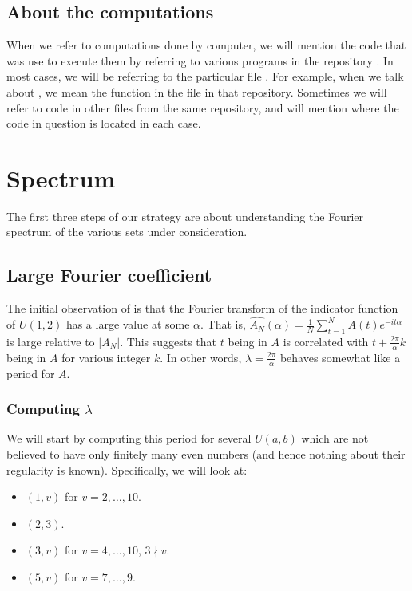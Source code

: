 \documentclass{report}
\theoremstyle{remark}
\numberwithin{equation}{section}
\begin{document}
\section{About the computations}

When we refer to computations done by computer, we will mention the
code that was use to execute them by referring to various programs in
the repository \cite{ross:gh2016}.  In most cases, we will be
referring to the particular file .  For
example, when we talk about , we mean the function
 in the  file in that
repository.  Sometimes we will refer to code in other files from the
same repository, and will mention where the code in question is
located in each case.

\chapter{Spectrum}

The first three steps of our strategy are about understanding the
Fourier spectrum of the various \relevant sets under consideration.

\section{Large Fourier coefficient}

The initial observation of \cite{steinerberger:preprint} is that the
Fourier transform of the indicator function of $U(1,2)$ has a large
value at some $\alpha$.  That is,
$\widehat{A_N}(\alpha) = \frac1N \sum_{t=1}^N A(t) e^{-it\alpha}$ is
large relative to $|A_N|$.  This suggests that $t$ being in $A$ is
correlated with $t+\frac{2\pi}{\alpha} k$ being in $A$ for various
integer $k$.  In other words, $\lambda = \frac{2\pi}{\alpha}$ behaves
somewhat like a period for $A$.

\subsection{Computing $\lambda$}

We will start by computing this period for several $U(a,b)$ which are
not believed to have only finitely many even numbers (and hence
nothing about their regularity is known).  Specifically, we will look
at:

\begin{itemize}
\item $(1,v)$ for $v = 2, \ldots, 10$.
\item $(2,3)$.
\item $(3,v)$ for $v = 4, \ldots, 10$, $3 \nmid v$.
\item $(5,v)$ for $v = 7, \ldots, 9$.
\end{itemize}
\end{document}
